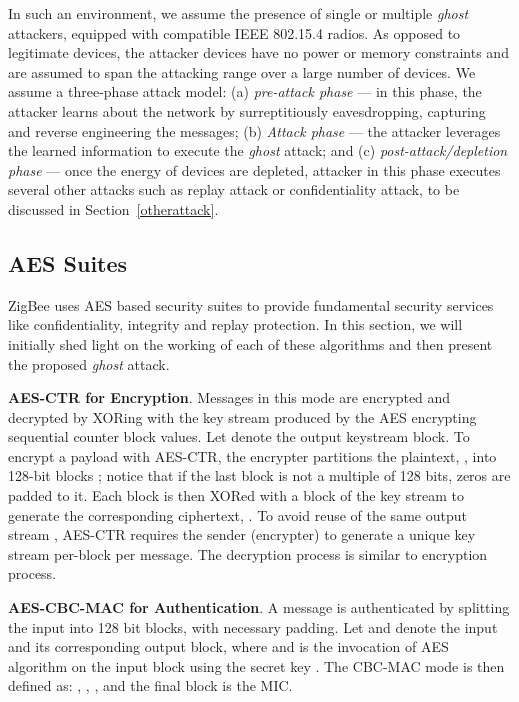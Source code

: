\documentclass[10pt,journal,cspaper,compsoc]{IEEEtran}
\begin{document}
In such an environment, we assume the presence of single or multiple {\em ghost} attackers, equipped with compatible IEEE 802.15.4 radios. As opposed to legitimate devices, the attacker devices have no power or memory constraints and are assumed to span the attacking range over a large number of devices. We assume a three-phase attack model: (a) {\em pre-attack phase} --- in this phase, the attacker learns about the network by surreptitiously eavesdropping, capturing and reverse engineering the messages; (b) {\em Attack phase} --- the attacker leverages the learned information to execute the {\em ghost} attack; and (c) {\em post-attack/depletion phase} --- once the energy of devices are depleted, attacker in this phase executes several other attacks such as replay attack or confidentiality attack, to be discussed in Section~\ref{otherattack}.



\subsection{AES Suites}
ZigBee uses AES \cite{daemen2002design} based security suites to provide fundamental security services like confidentiality, integrity and replay protection. In this section, we will initially shed light on the working of each of these algorithms and then present the proposed {\em ghost} attack.


{\bf AES-CTR for Encryption}.
Messages in this mode are encrypted and decrypted by XORing with the key stream produced by the AES encrypting sequential counter block values. Let   denote the output keystream block. To encrypt a payload with AES-CTR, the encrypter partitions the plaintext, , into  128-bit blocks ; notice that if the last block is not a multiple of 128 bits, zeros are padded to it. Each  block is then XORed with a block of the key stream  to generate the corresponding ciphertext, . To avoid reuse of the same output stream , AES-CTR requires the sender (encrypter) to generate a unique key stream per-block per message. The decryption process is similar to encryption process.

{\bf AES-CBC-MAC for Authentication}.
A message is authenticated by splitting the input  into  128 bit blocks, with necessary padding. Let  and  denote the input and its corresponding output block, where  and  is the invocation of AES algorithm on the  input block using the secret key . The CBC-MAC mode is then defined as: , , ,  and the final block is the MIC.
\end{document}
